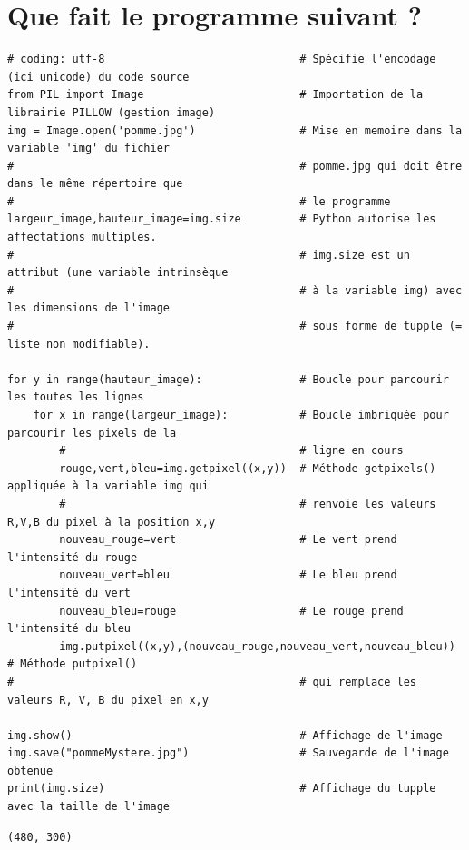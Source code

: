 \documentclass[11pt]{article}
\begin{document}
\section{Que fait le programme suivant ?}
\label{sec:org94417b3}

\begin{verbatim}
# coding: utf-8                              # Spécifie l'encodage (ici unicode) du code source
from PIL import Image                        # Importation de la librairie PILLOW (gestion image)
img = Image.open('pomme.jpg')                # Mise en memoire dans la variable 'img' du fichier 
#                                            # pomme.jpg qui doit être dans le même répertoire que
#                                            # le programme
largeur_image,hauteur_image=img.size         # Python autorise les affectations multiples.
#                                            # img.size est un attribut (une variable intrinsèque
#                                            # à la variable img) avec les dimensions de l'image
#                                            # sous forme de tupple (= liste non modifiable). 

for y in range(hauteur_image):               # Boucle pour parcourir les toutes les lignes
    for x in range(largeur_image):           # Boucle imbriquée pour parcourir les pixels de la
        #                                    # ligne en cours
        rouge,vert,bleu=img.getpixel((x,y))  # Méthode getpixels() appliquée à la variable img qui
        #                                    # renvoie les valeurs R,V,B du pixel à la position x,y
        nouveau_rouge=vert                   # Le vert prend l'intensité du rouge
        nouveau_vert=bleu                    # Le bleu prend l'intensité du vert
        nouveau_bleu=rouge                   # Le rouge prend l'intensité du bleu
        img.putpixel((x,y),(nouveau_rouge,nouveau_vert,nouveau_bleu)) # Méthode putpixel()
#                                            # qui remplace les valeurs R, V, B du pixel en x,y 

img.show()                                   # Affichage de l'image
img.save("pommeMystere.jpg")                 # Sauvegarde de l'image obtenue
print(img.size)                              # Affichage du tupple avec la taille de l'image 
\end{verbatim}

\begin{verbatim}
(480, 300)
\end{verbatim}
\end{document}
